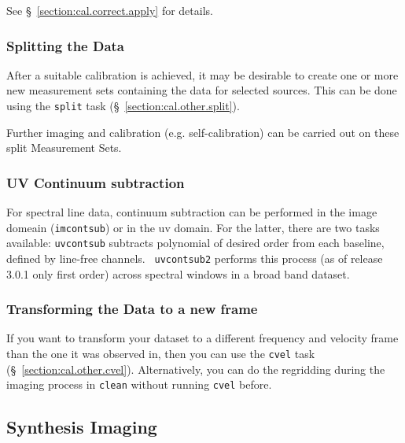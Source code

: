 See \S~\ref{section:cal.correct.apply} for details.
 

 

\subsubsection{Splitting the Data}
\label{section:intro.walkthru.calib.split}

After a suitable calibration is achieved, it may be desirable to
create one or more new measurement sets containing the data for
selected sources.  This can be done using the {\tt split} task
(\S~\ref{section:cal.other.split}).

Further imaging and calibration (e.g. self-calibration) can be
carried out on these split Measurement Sets.


\subsubsection{UV Continuum subtraction}
\label{section:intro.walkthru.calib.uvcontsub}

For spectral line data, continuum subtraction can be performed in the
image domeain ({\tt imcontsub}) or in the uv domain. For the latter,
there are two tasks available: {\tt uvcontsub} subtracts polynomial of
desired order from each baseline, defined by line-free channels. {\tt
  uvcontsub2} performs this process (as of release 3.0.1 only first
order) across spectral windows in a broad band dataset.


\subsubsection{Transforming the Data to a new frame}
\label{section:intro.walkthru.calib.cvel}

If you want to transform your dataset to a different frequency and
velocity frame than the one it was observed in, then you can use
the {\tt cvel} task
(\S~\ref{section:cal.other.cvel}). Alternatively, you can do the
regridding during the imaging process in {\tt clean} without running
{\tt cvel} before.


\subsection{Synthesis Imaging}
\label{section:intro.walkthru.image}

